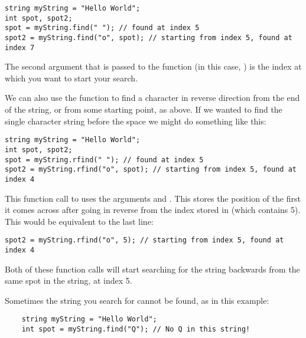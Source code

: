 \noindent\begin{minipage}{\linewidth}\begin{lstlisting}
string myString = "Hello World";
int spot, spot2;
spot = myString.find(" "); // found at index 5
spot2 = myString.find("o", spot); // starting from index 5, found at index 7
\end{lstlisting}\end{minipage}

\noindent The second argument that is passed to the function (in this case, ) is the index at which you want to start your search.

We can also use the  function to find a character in reverse direction from the end of the string, or from some starting point, as above.
If we wanted to find the single character string  before the space we might do something like this:

\noindent\begin{minipage}{\linewidth}\begin{lstlisting}
string myString = "Hello World";
int spot, spot2;
spot = myString.rfind(" "); // found at index 5
spot2 = myString.rfind("o", spot); // starting from index 5, found at index 4
\end{lstlisting}\end{minipage}

\noindent This function call to  uses the arguments  and .
This stores the position of the first  it comes across after going in reverse from the index stored in  (which contains 5).
This would be equivalent to the last line:

\noindent\begin{minipage}{\linewidth}\begin{lstlisting}
spot2 = myString.rfind("o", 5); // starting from index 5, found at index 4
\end{lstlisting}\end{minipage}

\noindent Both of these function calls will start searching for the string  backwards from the same spot in the string, at index 5. 

Sometimes the string you search for cannot be found, as in this example:

\noindent\begin{minipage}{\linewidth}\begin{lstlisting}
	string myString = "Hello World";
	int spot = myString.find("Q"); // No Q in this string!
\end{lstlisting}\end{minipage}


